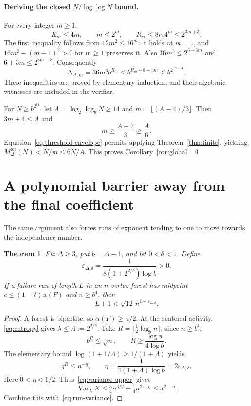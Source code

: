 \documentclass[11pt]{article}
\newtheorem{theorem}{Theorem}
\newcommand{\Var}{\operatorname{Var}}
\begin{document}
\paragraph{Deriving the closed $N/\log\log N$ bound.}
For every integer $m\ge1$,
\[
 K_m\le4m,\qquad m\le2^m,\qquad
 R_m\le8m4^m\le2^{3m+3}.
\]
The first inequality follows from $12m^2\le16^m$: it holds at $m=1$,
and $16m^2-(m+1)^2>0$ for $m\ge1$ preserves it. Also
$36m^3\le2^{6+3m}$ and $6+3m\le2^{3m+3}$. Consequently
\begin{equation}\label{eq:threshold-envelope}
 N_{\Delta,m}=36m^3b^{R_m}
 \le b^{R_m+6+3m}\le b^{2^{3m+4}}.
\end{equation}
These inequalities are proved by elementary induction, and their
algebraic witnesses are included in the verifier.

For $N\ge b^{2^{14}}$, let $A=\log_2\log_bN\ge14$ and
$m=\lfloor(A-4)/3\rfloor$. Then $3m+4\le A$ and
\[
 m\ge\frac{A-7}{3}\ge\frac A6.
\]
Equation~\eqref{eq:threshold-envelope} permits applying
Theorem~\ref{thm:finite}, yielding
$M_\Delta^{\mathrm{for}}(N)<N/m\le6N/A$. This proves
Corollary~\ref{cor:global}. \qed

\section{A polynomial barrier away from the final coefficient}
The same argument also forces runs of exponent tending to one to
move towards the independence number.

\begin{theorem}\label{thm:bulk}
Fix $\Delta\ge3$, put $b=\Delta-1$, and let $0<\delta<1$. Define
\[
 \varepsilon_{\Delta,\delta}
 =\frac1{8(1+2^{2/\delta})\log b}>0.
\]
If a failure run of length $L$ in an $n$-vertex forest has midpoint
$c\le(1-\delta)\alpha(F)$ and $n\ge b^4$, then
\begin{equation}\label{eq:bulk}
 \boxed{L+1<\sqrt{12}\,n^{1-\varepsilon_{\Delta,\delta}}.}
\end{equation}
\end{theorem}
\begin{proof}
A forest is bipartite, so $\alpha(F)\ge n/2$. At the centered activity,
\eqref{eq:entropy} gives
$\lambda\le\Lambda:=2^{2/\delta}$.
Take $R=\lfloor\tfrac12\log_b n\rfloor$; since $n\ge b^4$,
\[
 b^R\le\sqrt n,\qquad R\ge\frac{\log n}{4\log b}.
\]
The elementary bound
$\log(1+1/\Lambda)\ge1/(1+\Lambda)$ yields
\[
 q^R\le n^{-\eta},\qquad
 \eta=\frac1{4(1+\Lambda)\log b}=2\varepsilon_{\Delta,\delta}.
\]
Here $0<\eta<1/2$. Thus~\eqref{eq:variance-upper} gives
\[
 \Var_\lambda X\le\tfrac34n^{3/2}+\tfrac14n^{2-\eta}
 \le n^{2-\eta}.
\]
Combine this with~\eqref{eq:run-variance}.
\end{proof}
\end{document}
